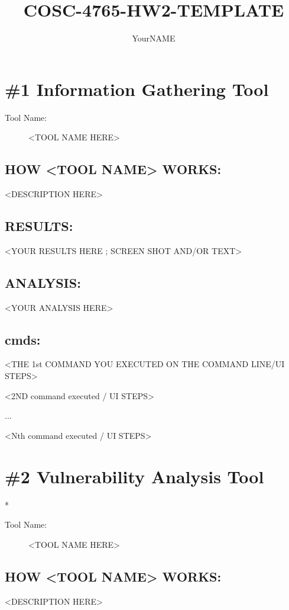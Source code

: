 \documentclass[letter]{article}
\title{COSC-4765-HW2-TEMPLATE}
\author{YourNAME}
\begin{document}
\section*{\#1 Information Gathering Tool}
\begin{description}
\item [Tool Name:] <TOOL NAME HERE>
\end{description}
\subsection*{ HOW <TOOL NAME> WORKS:}
<DESCRIPTION HERE>

\subsection*{RESULTS:}
<YOUR RESULTS HERE ; SCREEN SHOT AND/OR TEXT>

\subsection*{ANALYSIS:}
<YOUR ANALYSIS HERE>

\subsection*{cmds:}
\begin{enumerate}[label={[\arabic*]}]
\item <THE 1st COMMAND YOU EXECUTED ON THE COMMAND LINE/UI STEPS>
\item <2ND command executed / UI STEPS>
\item ...
\item <Nth command executed / UI STEPS>
\end{enumerate}

\section{\#2 Vulnerability Analysis Tool}
*
\begin{description}
\item [Tool Name:] <TOOL NAME HERE>
\end{description}
\subsection*{ HOW <TOOL NAME> WORKS:}
<DESCRIPTION HERE>
\end{document}
